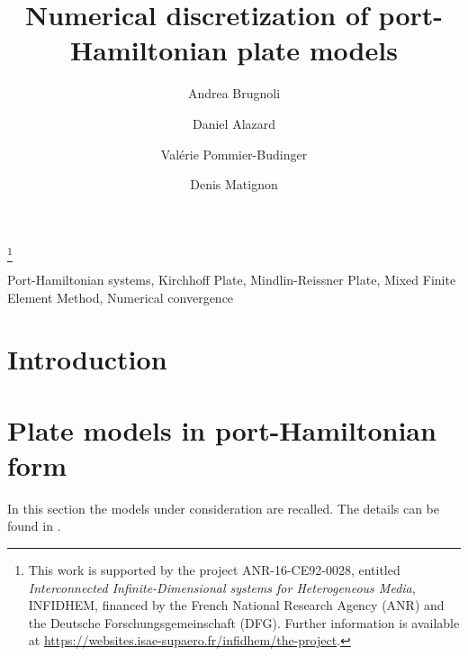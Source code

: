 \documentclass{ifacconf}
\begin{document}
\begin{frontmatter}

\title{Numerical discretization of port-Hamiltonian plate models } 

\thanks[footnoteinfo]{This work is  supported by the project ANR-16-CE92-0028,
	entitled {\em Interconnected Infinite-Dimensional systems for Heterogeneous
		Media}, INFIDHEM, financed by the French National
	Research Agency (ANR) and the Deutsche Forschungsgemeinschaft (DFG). Further information is available at {\url{https://websites.isae-supaero.fr/infidhem/the-project}}.
	}

\author[ISAE]{Andrea Brugnoli}
\author[ISAE]{Daniel Alazard} 
\author[ISAE]{Val\'erie Pommier-Budinger}
\author[ISAE]{Denis Matignon}

\address[ISAE]{ISAE-SUPAERO, Universit\'e de Toulouse, France.\\
	10 Avenue Edouard Belin, BP-54032, 31055 Toulouse Cedex 4. \\
	Andrea.Brugnoli@isae.fr,  Daniel.Alazard@isae.fr, \\
	Valerie.Budinger@isae.fr, Denis.Matignon@isae.fr}

\begin{abstract}

\end{abstract}

\begin{keyword}
Port-Hamiltonian systems, Kirchhoff Plate, Mindlin-Reissner Plate, Mixed Finite Element Method, Numerical convergence
\end{keyword}

\end{frontmatter}

\section{Introduction}


\section{Plate models in port-Hamiltonian form}

In this section the models under consideration are recalled. The details can be found in  \cite{BRUGNOLI2019961,BRUGNOLI2019940}. 
\end{document}
